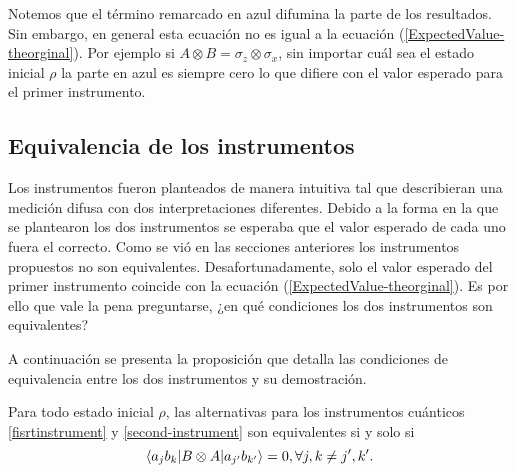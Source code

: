 Notemos que el término remarcado en azul difumina la parte de los resultados. Sin embargo, en general esta ecuación no es igual a la ecuación ({\ref{ExpectedValue-theorginal}}). Por ejemplo si $A\otimes B= \sigma_z\otimes \sigma_x$, sin importar cuál sea el estado inicial $\rho$ la parte en azul es siempre cero lo que difiere con el valor esperado para el primer instrumento. 



\subsection{Equivalencia de los instrumentos}


Los instrumentos fueron planteados de manera intuitiva tal que describieran una medición difusa con dos interpretaciones diferentes. Debido a la forma en la que se plantearon los dos instrumentos se esperaba que el valor esperado de cada uno fuera el correcto. Como se vió en las secciones anteriores los instrumentos propuestos no son equivalentes. Desafortunadamente, solo el valor esperado del primer instrumento coincide con la ecuación ({\ref{ExpectedValue-theorginal}}). Es por ello que vale la pena preguntarse, ¿en qué condiciones los dos instrumentos son equivalentes?


A continuación se presenta la proposición que detalla las condiciones de equivalencia entre los dos instrumentos y su demostración.

\begin{proposition}\label{prop:Equivalencia-instruments}
    Para todo estado inicial $\rho$, las alternativas para los instrumentos cuánticos {\ref{fisrtinstrument}} y {\ref{second-instrument}} son equivalentes si y solo si \[\langle a_j b_k|B\otimes A|a_{j'}b_{k'}\rangle=0, \forall j,k\ne j',k'.\] 
\end{proposition}

